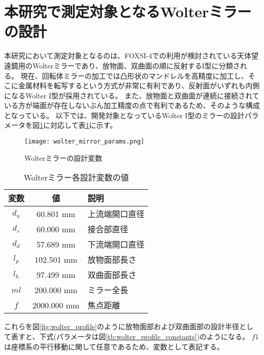\clearpage
\newpage

\section{本研究で測定対象となるWolterミラーの設計}
本研究において測定対象となるのは、FOXSI-4での利用が検討されている天体望遠鏡用のWolterミラーであり、放物面、双曲面の順に反射するI型に分類される。
現在、回転体ミラーの加工では凸形状のマンドレルを高精度に加工し、そこに金属材料を転写するという方式が非常に有利であり、反射面がいずれも内側になるWolter I型が採用されている。
また、放物面と双曲面が連続に接続されている方が端面が存在しないぶん加工精度の点で有利であるため、そのような構成となっている。
以下では、開発対象となっているWolter I型のミラーの設計パラメータを図\ref{fig:wolter_params}に対応して表\ref{tb:wolter_params}に示す。

\begin{figure}[h!]
\centering
\texttt{[image: wolter\_mirror\_params.png]}
\caption{Wolterミラーの設計変数}
\label{fig:wolter_params}
\end{figure}

\begin{table}[ht]
\begin{center}
  \begin{tabular}{|c|c|l|} \hline
    変数 & 値 & 説明 \\ \hline
    $d_u$ & 60.801 mm & 上流端開口直径 \\
    $d_s$ & 60.000 mm & 接合部直径 \\
    $d_d$ & 57.689 mm & 下流端開口直径 \\
    $l_p$ & 102.501 mm & 放物面部長さ \\
    $l_h$ & 97.499 mm & 双曲面部長さ \\
    $ml$ & 200.000 mm & ミラー全長 \\
    $f$ & 2000.000 mm & 焦点距離 \\ \hline
  \end{tabular}
  \caption{Wolterミラー各設計変数の値}
  \label{tb:wolter_params}
\end{center}
\end{table}

これらを図\ref{fig:wolter_profile}のように放物面部および双曲面部の設計半径として表すと、下式(パラメータは図\ref{tb:wolter_profile_constants})のようになる。
$f1$は座標系の平行移動に関して任意であるため、変数として表記する。

